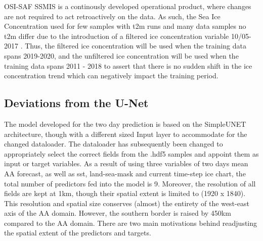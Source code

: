 \documentclass[../main/thesis]{subfiles}
\begin{document}
OSI-SAF SSMIS is a continously developed operational product, where changes are not required to act retroactively on the data. As such, the Sea Ice Concentration used for few samples with t2m runs and many data samples no t2m differ due to the introduction of a filtered ice concentration variable 10/05-2017 \cite{Tonboe2017}. Thus, the filtered ice concentration will be used when the training data spans 2019-2020, and the unfiltered ice concentration will be used when the training data spans 2011 - 2018 to assert that there is no sudden shift in the ice concentration trend which can negatively impact the training period.


\subsection{Deviations from the U-Net}




The model developed for the two day prediction is based on the SimpleUNET architecture, though with a different sized Input layer to accommodate for the changed dataloader. The dataloader has subsequently been changed to appropriately select the correct fields from the .hdf5 samples and appoint them as input or target variables. As a result of using three variables of two days mean AA forecast, as well as sst, land-sea-mask and current time-step ice chart, the total number of predictors fed into the model is 9. Moreover, the resolution of all fields are kept at 1km, though their spatial extent is limited to (1920 x 1840). This resolution and spatial size conserves (almost) the entirety of the west-east axis of the AA domain. However, the southern border is raised by 450km compared to the AA domain. There are two main motivations behind readjusting the spatial extent of the predictors and targets.
\end{document}
